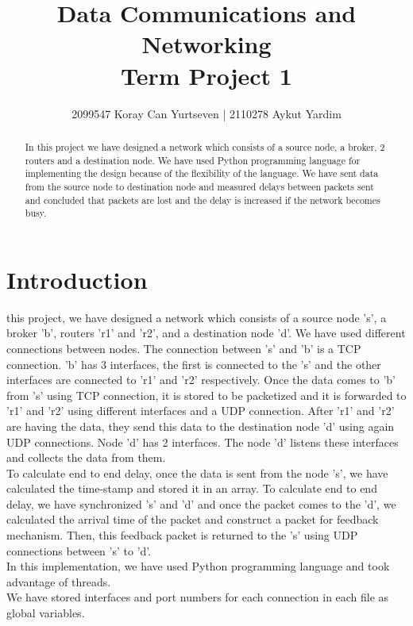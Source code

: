\documentclass[12pt,journal,compsoc]{IEEEtran}
\begin{document}
\title{Data Communications and Networking \\ Term Project 1}


\author{2099547 Koray Can Yurtseven | 2110278 Aykut Yardim}

\maketitle



\begin{abstract}
In this project we have designed a network which consists of a source node, a broker, 2 routers and a destination node. We have used Python programming language for implementing the design because of the flexibility of the language. We have sent data from the source node to destination node and measured delays between packets sent and concluded that packets are lost and the delay is increased  if the network becomes busy.
\end{abstract}

\section{Introduction}

 this project, we have designed a network which consists of a source node 's', a broker 'b', routers 'r1' and 'r2', and a destination node 'd'. We have used different connections between nodes. The connection between 's' and 'b' is a TCP connection. 'b' has 3 interfaces, the first is connected to the 's' and the other interfaces are connected to 'r1' and 'r2' respectively. Once the data comes to 'b' from 's' using TCP connection, it is stored to be packetized and it is forwarded to 'r1' and 'r2' using different interfaces and a UDP connection. After 'r1' and 'r2' are having the data, they send this data to the destination node 'd' using again UDP connections. Node 'd' has 2 interfaces. The node 'd' listens these interfaces and collects the data from them.\\
To calculate end to end delay, once the data is sent from the node 's', we have calculated the time-stamp and stored it in an array. To calculate end to end delay, we have synchronized 's' and 'd' and once the packet comes to the 'd', we calculated the arrival time of the packet and construct a packet for feedback mechanism. Then, this feedback packet is returned to the 's' using UDP connections between 's' to 'd'.\\
In this implementation, we have used Python programming language and took advantage of threads.\\
We have stored interfaces and port numbers for each connection in each file as global variables.
\end{document}
